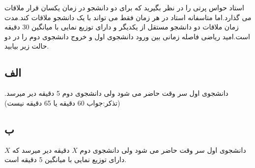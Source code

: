 
استاد حواس پرتی را در نظر بگیرید که برای دو دانشجو در زمان یکسان قرار ملاقات می گذارد.اما متاسفانه استاد در هر زمان فقط می تواند با یک دانشجو ملاقات کند.مدت زمان ملاقات دو دانشجو مستقل از یکدیگر و دارای توزیع نمایی با میانگین 30 دقیقه است.امید ریاضی فاصله زمانی بین ورود دانشجوی اول و خروج دانشجوی دوم را در دو حالت زیر بیابید.
\subsection*{الف}
دانشجوی اول سر وقت حاضر می شود ولی دانشجوی دوم 5 دقیقه دیر میرسد.(تذکر:جواب 60 دقیقه یا 65 دقیقه نیست)
\subsection*{ب}
دانشجوی اول سر وقت حاضر می شود ولی دانشجوی دوم $X$ دقیقه دیر میرسد که $X$ دارای توزیع نمایی با میانگین 5 دقیقه است.

